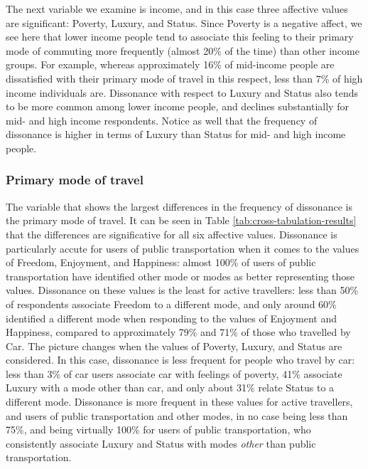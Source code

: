 \documentclass[]{elsarticle} %
\begin{document}
The next variable we examine is income, and in this case three affective
values are significant: Poverty, Luxury, and Status. Since Poverty is a
negative affect, we see here that lower income people tend to associate
this feeling to their primary mode of commuting more frequently (almost
20\% of the time) than other income groups. For example, whereas
approximately 16\% of mid-income people are dissatisfied with their
primary mode of travel in this respect, less than 7\% of high income
individuals are. Dissonance with respect to Luxury and Status also tends
to be more common among lower income people, and declines substantially
for mid- and high income respondents. Notice as well that the frequency
of dissonance is higher in terms of Luxury than Status for mid- and high
income people.

\hypertarget{primary-mode-of-travel}{%
\subsubsection{Primary mode of travel}\label{primary-mode-of-travel}}

The variable that shows the largest differences in the frequency of
dissonance is the primary mode of travel. It can be seen in Table
\ref{tab:cross-tabulation-results} that the differences are
significative for all six affective values. Dissonance is particularly
accute for users of public transportation when it comes to the values of
Freedom, Enjoyment, and Happiness: almost 100\% of users of public
transportation have identified other mode or modes as better
representing those values. Dissonance on these values is the least for
active travellers: less than 50\% of respondents associate Freedom to a
different mode, and only around 60\% identified a different mode when
responding to the values of Enjoyment and Happiness, compared to
approximately 79\% and 71\% of those who travelled by Car. The picture
changes when the values of Poverty, Luxury, and Status are considered.
In this case, dissonance is less frequent for people who travel by car:
less than 3\% of car users associate car with feelings of poverty, 41\%
associate Luxury with a mode other than car, and only about 31\% relate
Status to a different mode. Dissonance is more frequent in these values
for active travellers, and users of public transportation and other
modes, in no case being less than 75\%, and being virtually 100\% for
users of public transportation, who consistently associate Luxury and
Status with modes \emph{other} than public transportation.
\end{document}

